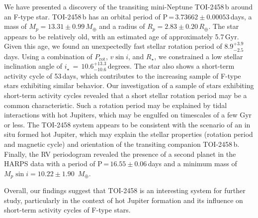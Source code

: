 \documentclass[traditabstract,longauth]{aa}
\begin{document}
We have presented a discovery of the transiting mini-Neptune TOI-2458\,b around an F-type star. TOI-2458\,b has an orbital period of P\,=\,$3.73662\pm0.00053$\,days, a mass of $M_p=13.31\pm0.99\,M_{\oplus}$ and a radius of $R_p=2.83\pm0.20\,R_{\oplus}$. The star appears to be relatively old, with an estimated age of approximately 5.7\,Gyr. Given this age, we found an unexpectedly fast stellar rotation period of $8.9_{-2.5}^{+3.9}$\,days. Using a combination of $P_\mathrm{rot}$, $v \sin{i}$, and $R_\star$, we constrained a low stellar inclination angle of $i_\star\,=\,10.6_{-10.6}^{+13.3}$\,degrees. The star also shows a short-term activity cycle of 53\,days, which contributes to the increasing sample of F-type stars exhibiting similar behavior. Our investigation of a sample of stars exhibiting short-term activity cycles revealed that a short stellar rotation period may be a common characteristic. Such a rotation period may be explained by tidal interactions with hot Jupiters, which may be engulfed on timescales of a few Gyr or less. The TOI-2458 system appears to be consistent with the scenario of an in situ formed hot Jupiter, which may explain the stellar properties (rotation period and magnetic cycle) and orientation of the transiting companion TOI-2458\,b. Finally, the RV periodogram revealed the presence of a second planet in the HARPS data with a period of P\,=\,$16.55\pm0.06$\,days and a minimum mass of $M_p \sin i=10.22\pm1.90$~$M_{\oplus}$.

Overall, our findings suggest that TOI-2458 is an interesting system for further study, particularly in the context of hot Jupiter formation and its influence on short-term activity cycles of F-type stars.
\end{document}
